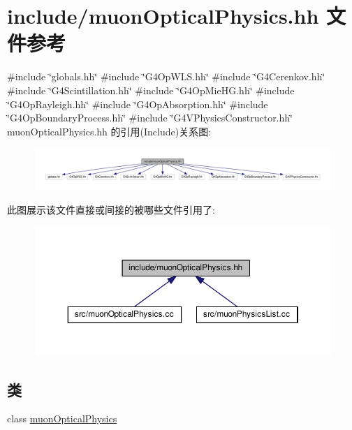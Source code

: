 \hypertarget{muonOpticalPhysics_8hh}{}\section{include/muon\+Optical\+Physics.hh 文件参考}
\label{muonOpticalPhysics_8hh}
{\ttfamily \#include \char`\"{}globals.\+hh\char`\"{}}\newline
{\ttfamily \#include \char`\"{}G4\+Op\+W\+L\+S.\+hh\char`\"{}}\newline
{\ttfamily \#include \char`\"{}G4\+Cerenkov.\+hh\char`\"{}}\newline
{\ttfamily \#include \char`\"{}G4\+Scintillation.\+hh\char`\"{}}\newline
{\ttfamily \#include \char`\"{}G4\+Op\+Mie\+H\+G.\+hh\char`\"{}}\newline
{\ttfamily \#include \char`\"{}G4\+Op\+Rayleigh.\+hh\char`\"{}}\newline
{\ttfamily \#include \char`\"{}G4\+Op\+Absorption.\+hh\char`\"{}}\newline
{\ttfamily \#include \char`\"{}G4\+Op\+Boundary\+Process.\+hh\char`\"{}}\newline
{\ttfamily \#include \char`\"{}G4\+V\+Physics\+Constructor.\+hh\char`\"{}}\newline
muon\+Optical\+Physics.\+hh 的引用(Include)关系图\+:\nopagebreak
\begin{figure}[H]
\begin{center}
\leavevmode
\includegraphics[width=350pt]{muonOpticalPhysics_8hh__incl}
\end{center}
\end{figure}
此图展示该文件直接或间接的被哪些文件引用了\+:\nopagebreak
\begin{figure}[H]
\begin{center}
\leavevmode
\includegraphics[width=350pt]{muonOpticalPhysics_8hh__dep__incl}
\end{center}
\end{figure}
\subsection*{类}
\begin{DoxyCompactItemize}
\item 
class \hyperlink{classmuonOpticalPhysics}{muon\+Optical\+Physics}
\end{DoxyCompactItemize}
